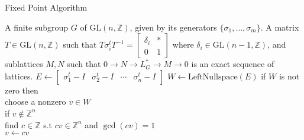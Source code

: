 \documentclass{article}
\theoremstyle{plain}
\theoremstyle{definition}
\newcommand{\Z}{\ensuremath{\mathbb{Z}}}
\begin{document}
\begin{algorithm}[H]
	\caption{Fixed Point Algorithm}
	\label{alg:Fixed Point}
	\begin{algorithmic}[1]
		\REQUIRE A finite subgroup $G$ of $\mathrm{GL}(n,\Z)$, given by its generators $\lbrace \sigma_1, \ldots , \sigma_m \rbrace$.
		\ENSURE A matrix $T \in \mathrm{GL}(n,\Z)$ such that $T \sigma^t_i T^{-1}= \left[ \begin{array}{c|c}
		\delta_i & \ast \\
		\hline 
		0 &1
		\end{array} \right]
		$ where $\delta_i \in \mathrm{GL}(n-1,\Z)$, and sublattices $M, N$ such that $0\longrightarrow N \longrightarrow L^*_G \longrightarrow M \longrightarrow 0$ is an exact sequence of lattices.
		\bigskip
		\STATE $E \gets \left[ \begin{array}{c|c|c|c}
		\sigma^t_1-I & \sigma^t_2 -I & \cdots & \sigma^t_n -I
		\end{array} \right]$
	    \STATE $W \gets \mathrm{LeftNullspace}(E)$
	    \STATE if $W $ is not zero then\\
	    \hspace{0.5in} choose a nonzero $v \in W$\\
	    \hspace{0.5 in} if $v \notin \Z^n$ \\
	    \hspace{1in} find $c \in \Z$ s.t $cv \in \Z^n$ and $\gcd(cv) = 1$\\
	    \hspace{1in} $v \gets cv$\\

\end{algorithmic}
\end{algorithm}
\end{document}
